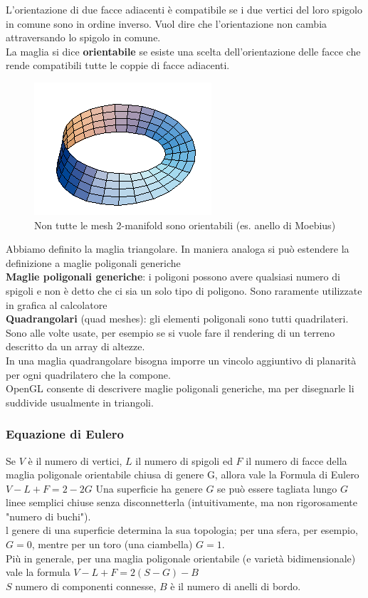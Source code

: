 \documentclass[a4paper, 10pt]{article}
\begin{document}
		\noindent
		L’orientazione di due facce adiacenti è compatibile se i due
		vertici del loro spigolo in comune sono in ordine inverso. Vuol
		dire che l’orientazione non cambia attraversando lo spigolo in
		comune.\\
		La maglia si dice \textbf{orientabile} se esiste una scelta
		dell’orientazione delle facce che rende compatibili tutte le
		coppie di facce adiacenti.
		
			\begin{figure}[h!]
				\centering
				\includegraphics[scale=0.5]{moebius}
				\caption{Non tutte le mesh 2-manifold sono
					orientabili (es. anello di Moebius)} 
			\end{figure}
		
		Abbiamo definito la maglia triangolare. In maniera analoga si
		può estendere la definizione a maglie poligonali generiche\\
		\textbf{Maglie poligonali generiche}: i poligoni possono avere qualsiasi
		numero di spigoli e non è detto che ci sia un solo tipo di poligono.
		Sono raramente utilizzate in grafica al calcolatore\\
		\textbf{Quadrangolari} (quad meshes): gli elementi poligonali sono tutti
		quadrilateri. Sono alle volte usate, per esempio se si vuole fare il
		rendering di un terreno descritto da un array di altezze.\\ In una
		maglia quadrangolare bisogna imporre un vincolo aggiuntivo di
		planarità per ogni quadrilatero che la compone.\\
		OpenGL consente di descrivere maglie poligonali generiche, ma
		per disegnarle li suddivide usualmente in triangoli.
		
	\subsubsection{Equazione di Eulero}
		Se $ V $ è il numero di vertici, $ L $ il numero di spigoli ed $ F $ il numero di
		facce della maglia poligonale orientabile chiusa di genere G, allora
		vale la Formula di Eulero $ V - L + F = 2 - 2G $
		Una superficie ha genere $ G $ se può essere tagliata lungo $ G $
		linee semplici chiuse senza disconnetterla (intuitivamente,
		ma non rigorosamente "numero di buchi").\\
		l genere di una superficie determina la sua
		topologia; per una sfera, per esempio, $ G = 0 $,
		mentre per un toro (una ciambella) $ G = 1 $.\\
		Più in generale, per una maglia poligonale orientabile (e varietà
		bidimensionale) vale la formula $ V - L + F = 2(S - G) - B $\\
		$ S $ numero di componenti connesse, $ B $ è il numero di anelli di bordo.
		
\end{document}
